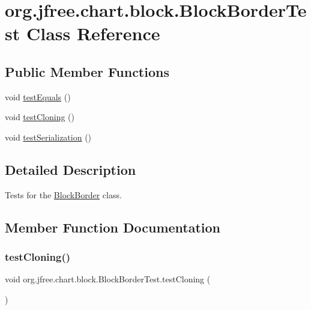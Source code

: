 \hypertarget{classorg_1_1jfree_1_1chart_1_1block_1_1_block_border_test}{}\section{org.\+jfree.\+chart.\+block.\+Block\+Border\+Test Class Reference}
\label{classorg_1_1jfree_1_1chart_1_1block_1_1_block_border_test}
\subsection*{Public Member Functions}
\begin{DoxyCompactItemize}
\item 
void \mbox{\hyperlink{classorg_1_1jfree_1_1chart_1_1block_1_1_block_border_test_a6e535c3882d5788aebd5ba8b598e3c02}{test\+Equals}} ()
\item 
void \mbox{\hyperlink{classorg_1_1jfree_1_1chart_1_1block_1_1_block_border_test_a758ccaeb96a32e12366a1f8916005092}{test\+Cloning}} ()
\item 
void \mbox{\hyperlink{classorg_1_1jfree_1_1chart_1_1block_1_1_block_border_test_a032b24b65ef430324a3638e419e9f004}{test\+Serialization}} ()
\end{DoxyCompactItemize}


\subsection{Detailed Description}
Tests for the \mbox{\hyperlink{classorg_1_1jfree_1_1chart_1_1block_1_1_block_border}{Block\+Border}} class. 

\subsection{Member Function Documentation}
\mbox{\label{classorg_1_1jfree_1_1chart_1_1block_1_1_block_border_test_a758ccaeb96a32e12366a1f8916005092}} 
\subsubsection{\texorpdfstring{test\+Cloning()}{testCloning()}}
{\footnotesize\ttfamily void org.\+jfree.\+chart.\+block.\+Block\+Border\+Test.\+test\+Cloning (\begin{DoxyParamCaption}{ }\end{DoxyParamCaption})}

